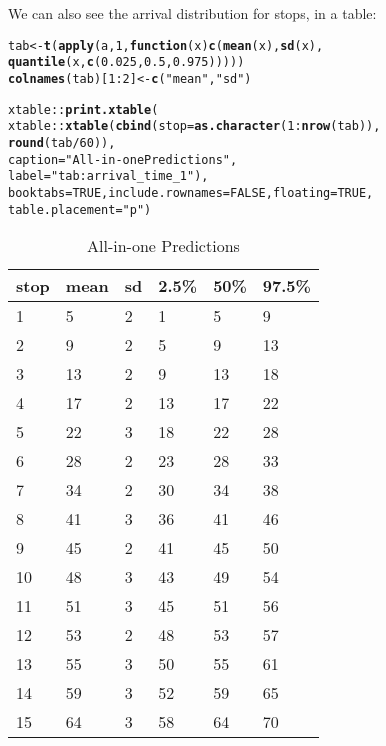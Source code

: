 \documentclass[11pt]{article}\usepackage[]{graphicx}\usepackage[]{color}
\makeatletter
\newcommand{\hlnum}[1]{\textcolor[rgb]{0.686,0.059,0.569}{#1}}%
\newcommand{\hlstr}[1]{\textcolor[rgb]{0.192,0.494,0.8}{#1}}%
\newcommand{\hlopt}[1]{\textcolor[rgb]{0,0,0}{#1}}%
\newcommand{\hlstd}[1]{\textcolor[rgb]{0.345,0.345,0.345}{#1}}%
\newcommand{\hlkwa}[1]{\textcolor[rgb]{0.161,0.373,0.58}{\textbf{#1}}}%
\newcommand{\hlkwb}[1]{\textcolor[rgb]{0.69,0.353,0.396}{#1}}%
\newcommand{\hlkwc}[1]{\textcolor[rgb]{0.333,0.667,0.333}{#1}}%
\newcommand{\hlkwd}[1]{\textcolor[rgb]{0.737,0.353,0.396}{\textbf{#1}}}%
\newenvironment{kframe}{%
 \def\at@end@of@kframe{}%
 \ifinner\ifhmode%
  \def\at@end@of@kframe{\end{minipage}}%
  \begin{minipage}{\columnwidth}%
 \fi\fi%
 \def\FrameCommand##1{\hskip\@totalleftmargin \hskip-\fboxsep
 \colorbox{shadecolor}{##1}\hskip-\fboxsep
     \hskip-\linewidth \hskip-\@totalleftmargin \hskip\columnwidth}%
 \MakeFramed {\advance\hsize-\width
   \@totalleftmargin\z@ \linewidth\hsize
   \@setminipage}}%
 {\par\unskip\endMakeFramed%
 \at@end@of@kframe}
\makeatother
\begin{document}
We can also see the arrival distribution for stops, in a table:
\begin{kframe}
\begin{alltt}
\hlstd{tab} \hlkwb{<-} \hlkwd{t}\hlstd{(}\hlkwd{apply}\hlstd{(a,} \hlnum{1}\hlstd{,} \hlkwa{function}\hlstd{(}\hlkwc{x}\hlstd{)} \hlkwd{c}\hlstd{(}\hlkwd{mean}\hlstd{(x),} \hlkwd{sd}\hlstd{(x),}
                                   \hlkwd{quantile}\hlstd{(x,} \hlkwd{c}\hlstd{(}\hlnum{0.025}\hlstd{,} \hlnum{0.5}\hlstd{,} \hlnum{0.975}\hlstd{)))))}
\hlkwd{colnames}\hlstd{(tab)[}\hlnum{1}\hlopt{:}\hlnum{2}\hlstd{]} \hlkwb{<-} \hlkwd{c}\hlstd{(}\hlstr{"mean"}\hlstd{,} \hlstr{"sd"}\hlstd{)}

\hlstd{xtable}\hlopt{::}\hlkwd{print.xtable}\hlstd{(}
    \hlstd{xtable}\hlopt{::}\hlkwd{xtable}\hlstd{(}\hlkwd{cbind}\hlstd{(}\hlkwc{stop} \hlstd{=} \hlkwd{as.character}\hlstd{(}\hlnum{1}\hlopt{:}\hlkwd{nrow}\hlstd{(tab)),}
                         \hlkwd{round}\hlstd{(tab} \hlopt{/} \hlnum{60}\hlstd{)),}
                   \hlkwc{caption} \hlstd{=} \hlstr{"All-in-one Predictions"}\hlstd{,}
                   \hlkwc{label} \hlstd{=} \hlstr{"tab:arrival_time_1"}\hlstd{),}
    \hlkwc{booktabs} \hlstd{=} \hlnum{TRUE}\hlstd{,} \hlkwc{include.rownames} \hlstd{=} \hlnum{FALSE}\hlstd{,} \hlkwc{floating} \hlstd{=} \hlnum{TRUE}\hlstd{,}
    \hlkwc{table.placement} \hlstd{=} \hlstr{"p"}\hlstd{)}
\end{alltt}
\end{kframe}%
\begin{table}[p]
\centering
\begin{tabular}{llllll}
  \toprule
stop & mean & sd & 2.5\% & 50\% & 97.5\% \\ 
  \midrule
1 & 5 & 2 & 1 & 5 & 9 \\ 
  2 & 9 & 2 & 5 & 9 & 13 \\ 
  3 & 13 & 2 & 9 & 13 & 18 \\ 
  4 & 17 & 2 & 13 & 17 & 22 \\ 
  5 & 22 & 3 & 18 & 22 & 28 \\ 
  6 & 28 & 2 & 23 & 28 & 33 \\ 
  7 & 34 & 2 & 30 & 34 & 38 \\ 
  8 & 41 & 3 & 36 & 41 & 46 \\ 
  9 & 45 & 2 & 41 & 45 & 50 \\ 
  10 & 48 & 3 & 43 & 49 & 54 \\ 
  11 & 51 & 3 & 45 & 51 & 56 \\ 
  12 & 53 & 2 & 48 & 53 & 57 \\ 
  13 & 55 & 3 & 50 & 55 & 61 \\ 
  14 & 59 & 3 & 52 & 59 & 65 \\ 
  15 & 64 & 3 & 58 & 64 & 70 \\ 
   \bottomrule
\end{tabular}
\caption{All-in-one Predictions} 
\label{tab:arrival_time_1}
\end{table}
\end{document}
